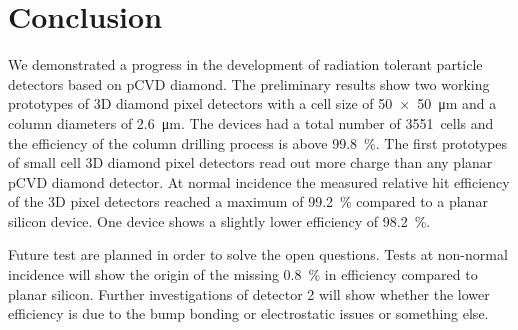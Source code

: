 \section{Conclusion}
We demonstrated a progress in the development of radiation tolerant particle detectors based on \ac{pCVD} diamond. The preliminary results show two working prototypes of 3D diamond pixel detectors with a cell size of \SI{50x50}{\um} and a column diameters of \SI{2.6}{\um}. The devices had a total number of \SI{3551}{cells} and the efficiency of the column drilling process is above \SI{99.8}{\%}. The first prototypes of small cell 3D diamond pixel detectors read out more charge than any planar \ac{pCVD} diamond detector. At normal incidence the measured relative hit efficiency of the 3D pixel detectors reached a maximum of \SI{99.2}{\%} compared to a planar silicon device. One device shows a slightly lower efficiency of \SI{98.2}{\%}.\par
Future test are planned in order to solve the open questions. Tests at non-normal incidence will show the origin of the missing \SI{.8}{\%} in efficiency compared to planar silicon. Further investigations of detector 2 will show whether the lower efficiency is due to the bump bonding or electrostatic issues or something else.